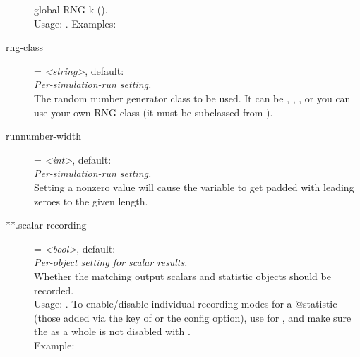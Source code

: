 \begin{description}
    global RNG k ().\\Usage:
    .
    Examples:
\item[rng-class] = \textit{<string>}, default: \\
    \textit{Per-simulation-run setting.}\\
    The random number generator class to be used. It can be
    , , , or you can use
    your own RNG class (it must be subclassed from ).
\item[runnumber-width] = \textit{<int>}, default: \\
    \textit{Per-simulation-run setting.}\\
    Setting a nonzero value will cause the  variable to get
    padded with leading zeroes to the given length.
\item[**.scalar-recording] = \textit{<bool>}, default: \\
    \textit{Per-object setting for scalar results.}\\
    Whether the matching output scalars and statistic objects should be
    recorded.\\Usage:
    .
    To enable/disable individual recording modes for a @statistic (those added
    via the  key of
     or the
    config option), use 
    for , and make sure the
     as a whole is not disabled with
    .\\Example:

\end{description}
